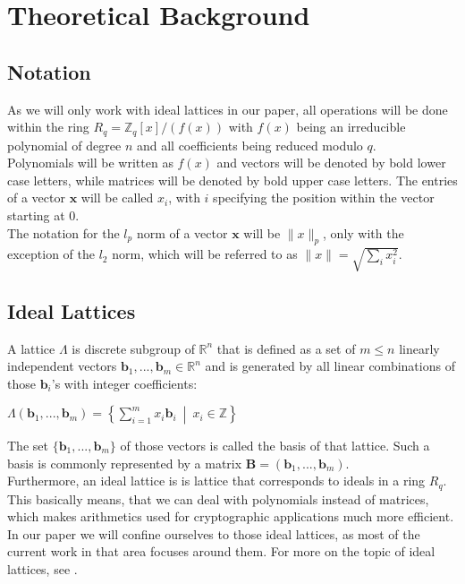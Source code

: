 %
%

\chapter{Theoretical Background}

\section{Notation}
As we will only work with ideal lattices in our paper, all operations will be done within the ring \(R_q=\mathbb{Z}_q[x]/(f(x))\) with \(f(x)\) being an irreducible polynomial of degree \(n\) and all coefficients being reduced modulo \(q\).\\
Polynomials will be written as \(f(x)\) and vectors will be denoted by bold lower case letters, while matrices will be denoted by bold upper case letters. The entries of a vector \(\textbf{x}\) will be called \(x_i\), with \(i\) specifying the position within the vector starting at 0.\\
The notation for the \(l_p\) norm of a vector \(\textbf{x}\) will be \(\|x\|_p\), only with the exception of the \(l_2\) norm, which will be referred to as \(\|x\|=\sqrt{\sum_{i} x_i^2}\).

\section{Ideal Lattices}
A lattice \(\Lambda\) is discrete subgroup of \(\mathbb{R}^n\) that is defined as a set of \(m \leq n\) linearly independent vectors \(\textbf{b}_1,...,\textbf{b}_m \in \mathbb{R}^n\) and is generated by all linear combinations of those \(\textbf{b}_i\)'s with integer coefficients:
\begin{center}
	\(\Lambda(\textbf{b}_1,...,\textbf{b}_m)=\left \{ \displaystyle \sum_{i=1}^{m} x_i \textbf{b}_i \: \middle | \: x_i \in \mathbb{Z} \right \}\)
\end{center}
The set \(\{\textbf{b}_1,...,\textbf{b}_m\}\) of those vectors is called the basis of that lattice. Such a basis is commonly represented by a matrix \(\textbf{B}=(\textbf{b}_1,...,\textbf{b}_m)\).\\
Furthermore, an ideal lattice is is lattice that corresponds to ideals in a ring \(R_q\). This basically means, that we can deal with polynomials instead of matrices, which makes arithmetics used for cryptographic applications much more efficient. In our paper we will confine ourselves to those ideal lattices, as most of the current work in that area focuses around them. For more on the topic of ideal lattices, see \cite{cryptoeprint:2012:230}.

